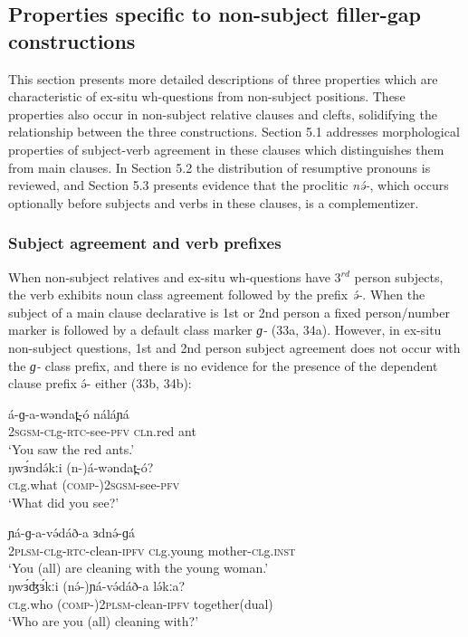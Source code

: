 
\subsection{Properties specific to non-subject filler-gap constructions}

This section presents more detailed descriptions of three properties which are characteristic of ex-situ wh-questions from non-subject positions. These properties also occur in non-subject relative clauses and clefts, solidifying the relationship between the three constructions. Section 5.1 addresses morphological properties of subject-verb agreement in these clauses which distinguishes them from main clauses. In Section 5.2 the distribution of resumptive pronouns is reviewed, and Section 5.3 presents evidence that the proclitic \textit{nə́-}, which occurs optionally before subjects and verbs in these clauses, is a complementizer.

\subsubsection{Subject agreement and verb prefixes}

When non-subject relatives and ex-situ wh-questions have 3$^{rd}$ person subjects, the verb exhibits noun class agreement followed by the prefix \textit{ə́-}. When the subject of a main clause declarative is 1st or 2nd person a fixed person/number marker is followed by a default class marker \textit{ɡ-} (33a, 34a). However, in ex-situ non-subject questions, 1st and 2nd person subject agreement does not occur with the \textit{ɡ-} class prefix, and there is no evidence for the presence of the dependent clause prefix ə́- either (33b, 34b):

\ea
\ea \gll	á-ɡ-a-wəndat̪-ó	náláɲá\\
		2\textsc{sgsm-cl}g-\textsc{rtc}-see-\textsc{pfv}	\textsc{cl}n.red ant\\
\trans		‘You saw the red ants.’\\
\ex \gll	ŋwɜ́ndə́kːi	(n-)á-wəndat̪-ó?\\
		\textsc{cl}g.what	(\textsc{comp-})2\textsc{sgsm}-see-\textsc{pfv}\\
\trans		‘What did you see?’   	\\
\z
\z

\ea
\ea	\gll	ɲá-ɡ-a-və́dáð-a	ɜdnə́-ɡá    \\                    
		2\textsc{plsm-cl}g-\textsc{rtc}-clean-\textsc{ipfv}	\textsc{cl}g.young mother-\textsc{cl}g.\textsc{inst}\\
\trans		‘You (all) are cleaning with the young woman.’\\
\ex	\gll	ŋwɜ́ʤɜ́kːi	(nə́-)ɲá-və́dáð-a	lə́kːa?\\
		\textsc{cl}g.who	(\textsc{comp-})2\textsc{plsm}-clean-\textsc{ipfv}	together(dual)\\
\trans		‘Who are you (all) cleaning with?’\\
\z
\z

